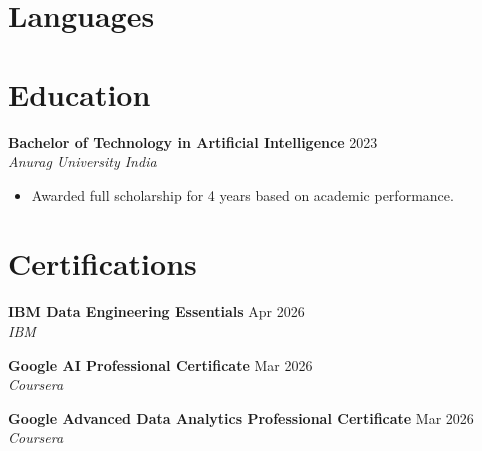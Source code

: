 \documentclass[10pt,letterpaper]{article}
\newcommand{\entry}[3]{%
  \vspace{3pt}\textbf{#1} \hfill #3 \\
  \textit{\small #2}\vspace{1pt}}
\begin{document}
\section{Languages}


\section{Education}

\entry{Bachelor of Technology in Artificial Intelligence}{Anurag University \textbullet{} India}{2023}
\begin{itemize}
  \item Awarded full scholarship for 4 years based on academic performance.
\end{itemize}

\section{Certifications}

\textbf{IBM Data Engineering Essentials} \hfill Apr 2026 \\
\textit{IBM}

\textbf{Google AI Professional Certificate} \hfill Mar 2026 \\
\textit{Coursera}

\textbf{Google Advanced Data Analytics Professional Certificate} \hfill Mar 2026 \\
\textit{Coursera}
\end{document}
